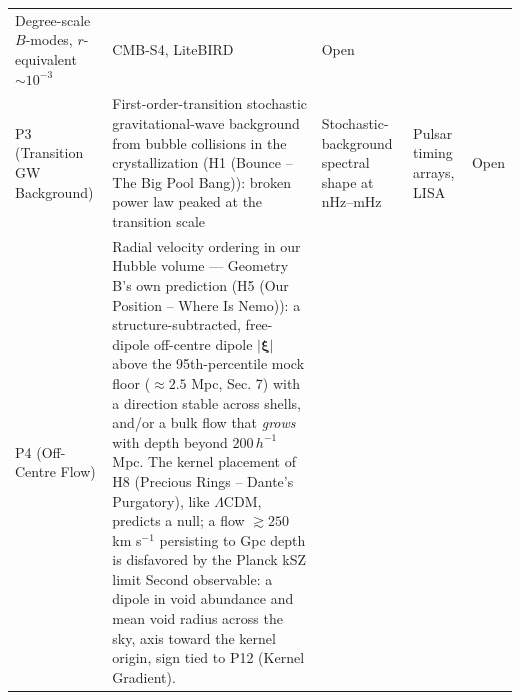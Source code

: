 \documentclass[
  11pt,
]{article}
\begin{document}
\begin{longtable}[]{@{}lllll@{}}
\begin{minipage}[t]{0.19\columnwidth}
Degree-scale \(B\)-modes, \(r\)-equivalent \(\sim\!10^{-3}\)\strut
\end{minipage} & \begin{minipage}[t]{0.19\columnwidth}\raggedright
CMB-S4, LiteBIRD\strut
\end{minipage} & \begin{minipage}[t]{0.19\columnwidth}\raggedright
Open\strut
\end{minipage}\tabularnewline
\begin{minipage}[t]{0.11\columnwidth}\raggedright
P3 (Transition GW Background)\strut
\end{minipage} & \begin{minipage}[t]{0.19\columnwidth}\raggedright
First-order-transition stochastic gravitational-wave background from
bubble collisions in the crystallization (H1 (Bounce -- The Big Pool
Bang)): broken power law peaked at the transition scale\strut
\end{minipage} & \begin{minipage}[t]{0.19\columnwidth}\raggedright
Stochastic-background spectral shape at nHz--mHz\strut
\end{minipage} & \begin{minipage}[t]{0.19\columnwidth}\raggedright
Pulsar timing arrays, LISA\strut
\end{minipage} & \begin{minipage}[t]{0.19\columnwidth}\raggedright
Open\strut
\end{minipage}\tabularnewline
\begin{minipage}[t]{0.11\columnwidth}\raggedright
P4 (Off-Centre Flow)\strut
\end{minipage} & \begin{minipage}[t]{0.19\columnwidth}\raggedright
Radial velocity ordering in our Hubble volume --- Geometry B's own
prediction (H5 (Our Position -- Where Is Nemo)): a structure-subtracted,
free-dipole off-centre dipole \(|\boldsymbol{\xi}|\) above the
95th-percentile mock floor (\(\approx 2.5\) Mpc, Sec. 7) with a
direction stable across shells, and/or a bulk flow that \emph{grows}
with depth beyond \(200\,h^{-1}\) Mpc. The kernel placement of H8
(Precious Rings -- Dante's Purgatory), like \(\Lambda\)CDM, predicts a
null; a flow \(\gtrsim 250\) km s\(^{-1}\) persisting to Gpc depth is
disfavored by the Planck kSZ limit Second observable: a dipole in void
abundance and mean void radius across the sky, axis toward the kernel
origin, sign tied to P12 (Kernel Gradient).\strut
\end{minipage} & \begin{minipage}[t]{0.19\columnwidth}\raggedright

\end{minipage}
\end{longtable}
\end{document}
